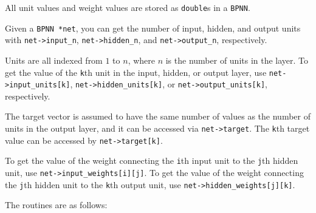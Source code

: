 All unit values and weight values are stored as {\tt double}s in a
{\tt BPNN}.

Given a {\tt BPNN *net}, you can get the number of input, hidden,
and output units with {\tt net->input\_n}, {\tt net->hidden\_n},
and {\tt net->output\_n}, respectively.

Units are all indexed from $1$ to $n$,
where $n$ is the number of units in the layer.  To get the value
of the {\tt k}th unit in the input, hidden, or output layer, use
{\tt net->input\_units[k]}, {\tt net->hidden\_units[k]}, or
{\tt net->output\_units[k]}, respectively.

The target vector is assumed to have the same number of values as the number
of units in the output layer, and it can be accessed via {\tt net->target}.
The {\tt k}th target value can be accessed by {\tt net->target[k]}.

To get the value of the weight connecting the {\tt i}th input unit
to the {\tt j}th hidden unit, use {\tt net->input\_weights[i][j]}.
To get the value of the weight connecting the {\tt j}th hidden unit
to the {\tt k}th output unit, use {\tt net->hidden\_weights[j][k]}.

The routines are as follows:

